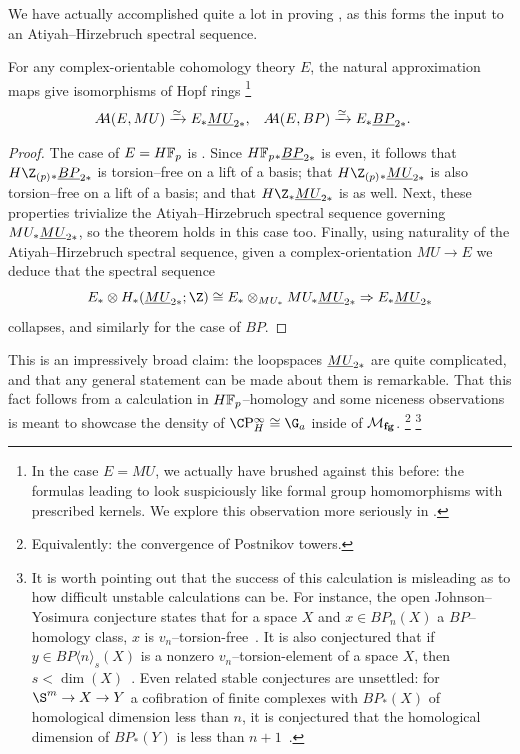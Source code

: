We have actually accomplished quite a lot in proving , as this forms the input to an Atiyah--Hirzebruch spectral sequence.

\begin{corollary}\label{HopfRingForEBP}
For any complex-orientable cohomology theory \(E\), the natural approximation maps give isomorphisms of Hopf rings%
\footnote{%
In the case \(E = MU\), we actually have brushed against this before: the formulas leading to  look suspiciously like formal group homomorphisms with prescribed kernels.
We explore this observation more seriously in .
}
\begin{align*}
\AA(E, MU) & \xrightarrow{\simeq} E_* \OS{MU}{2*}, &
\AA(E, BP) & \xrightarrow{\simeq} E_* \OS{BP}{2*}.
\end{align*}
\end{corollary}
\begin{proof}
The case of \(E = \HFp\) is .
Since \(\HFp_* \OS{BP}{2*}\) is even, it follows that \(H\Z_{(p)}{}_* \OS{BP}{2*}\) is torsion--free on a lift of a basis; that \(H\Z_{(p)}{}_* \OS{MU}{2*}\) is also torsion--free on a lift of a basis; and that \(H\Z_* \OS{MU}{2*}\) is as well.
Next, these properties trivialize the Atiyah--Hirzebruch spectral sequence governing \(MU_* \OS{MU}{2*}\), so the theorem holds in this case too.
Finally, using naturality of the Atiyah--Hirzebruch spectral sequence, given a complex-orientation \(MU \to E\) we deduce that the spectral sequence \[E_* \otimes H_*(\OS{MU}{2*}; \Z) \cong E_* \otimes_{MU_*} MU_* \OS{MU}{2*} \Rightarrow E_* \OS{MU}{2*}\] collapses, and similarly for the case of \(BP\).
\end{proof}

This is an impressively broad claim: the loopspaces \(\OS{MU}{2*}\) are quite complicated, and that any general statement can be made about them is remarkable.
That this fact follows from a calculation in \(\HFp\)--homology and some niceness observations is meant to showcase the density of \(\CP^\infty_H \cong \G_a\) inside of \(\mathcal{M}_{\mathbf{fg}}\).%
\footnote{%
Equivalently: the convergence of Postnikov towers.
}%
\footnote{%
It is worth pointing out that the success of this calculation is misleading as to how difficult unstable calculations can be.
For instance, the open Johnson--Yosimura conjecture states that for a space \(X\) and \(x \in BP_n(X)\) a \(BP\)--homology class, \(x\) is \(v_n\)--torsion-free~\cite[pg.\ 37]{Wilson}.
It is also conjectured that if \(y \in BP\langle n \rangle_s(X)\) is a nonzero \(v_n\)--torsion-element of a space $X$, then \(s < \dim(X)\)~\cite[Question 6.11]{JohnsonWilsonProjDim}.
Even related stable conjectures are unsettled: for \(\S^m \to X \to Y\) a cofibration of finite complexes with \(BP_*(X)\) of homological dimension less than \(n\), it is conjectured that the homological dimension of \(BP_*(Y)\) is less than \(n+1\)~\cite[Conjecture 6.8]{JohnsonWilsonProjDim}.
}

